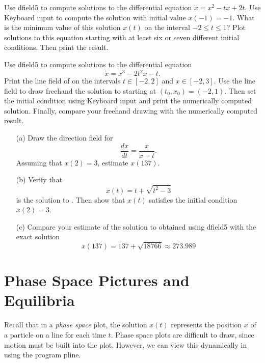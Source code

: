 \documentclass{ximera}
\begin{document}
\begin{exercise} \label{c3.2.2}
Use {\sf dfield5} to compute solutions to the differential equation
$\dot{x} = x^2-tx+2t$. Use {\sf Keyboard input} to compute the solution
with initial value $x(-1)=-1$.  What is the minimum value of this
solution $x(t)$ on the interval $-2\leq t\leq 1$?  Plot
solutions to this equation starting with at least six or seven
different initial conditions. Then print the result.
\end{exercise}

\begin{exercise} \label{c3.2.3}
Use {\sf dfield5} to compute solutions to the differential
equation
\begin{equation}  \label{E:freehand}
\dot{x} = x^3-2t^2x-t.
\end{equation}
Print the line field of  on the intervals
$t\in[-2,2]$ and $x\in[-2,3]$.  Use the line field to draw freehand
the solution to  starting at $(t_0,x_0)=(-2,1)$.
Then set the initial condition using {\sf Keyboard input}
and print the numerically computed solution. Finally, compare
your freehand drawing with the numerically computed result.
\end{exercise}

\begin{exercise}  \label{exer:at}
\begin{itemize}
\item[(a)]  Draw the direction field for
\begin{equation} \label{ex:at}
\frac{dx}{dt} = \frac{x}{x-t}.
\end{equation}
Assuming that $x(2)=3$, estimate $x(137)$.
\item[(b)]  Verify that
\[
x(t) = t + \sqrt{t^2-3}
\]
is the solution to .  Then show that $x(t)$ satisfies the
initial condition $x(2)=3$.
\item[(c)]  Compare your estimate of the solution to 
obtained using {\sf dfield5} with the exact solution
\[
x(137)= 137 +\sqrt{18766} \approx 273.989
\]
\end{itemize}
\end{exercise}

\section{Phase Space Pictures and Equilibria} \label{S:PSP&E}

Recall that in a {\em phase space\/}  plot, the 
solution $x(t)$ represents the position $x$ of a particle on a line 
for each time $t$.  Phase space plots are difficult to draw, since 
motion must be built into the plot.  However, we can view this 
dynamically in \Matlab using the program {\sf pline}. 
\end{document}
